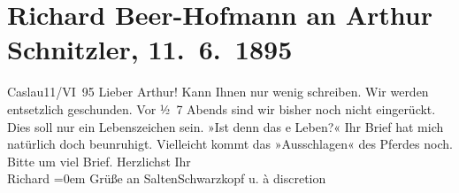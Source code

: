 

         
         \renewcommand{\erwaehntePersonen}{Personen: Felix Salten, Gustav Schwarzkopf}
         \renewcommand{\erwaehnteOrte}{Orte: Caslau, Wien}
         \renewcommand{\erwaehnteWerke}{}
               \section[Richard Beer-Hofmann an Arthur Schnitzler, 11. 6. 1895]{ Richard Beer-Hofmann an Arthur Schnitzler,
               11. 6. 1895}\nopagebreak{}\rehead{ }\begin{ledgroupsized}[t]{13cm}\normalsize\beginnumbering \toendnotes[C]{\smallbreak\pagebreak[2]} 
\pstart
           {\pb}Caslau11/VI 95\pend
           \pstart
           Lieber Arthur! Kann Ihnen nur wenig schreiben. Wir werden
               entsetzlich geschunden. Vor ½ 7 Abends
                sind wir bisher noch nicht
               eingerückt. Dies soll nur ein Lebenszeichen sein. »Ist denn {\pb}das e Leben?« Ihr Brief hat mich
               natürlich doch beunruhigt. Vielleicht kommt das »Ausschlagen« des Pferdes noch. Bitte
               um viel Brief. Herzlichst\pend
           \pstart
           Ihr{\\[\baselineskip]}\spacefill\mbox{Richard}\pend
           \leftskip=0em{}\pstart
           Grüße an SaltenSchwarzkopf u. à discretion\pend
           
         
         \endnumbering{}\end{ledgroupsized}  \newcommand{\dateiname}{L00451}\newcommand{\titel}{Richard Beer-Hofmann an Arthur Schnitzler, 11. 6. 1895}\newcommand{\editorInnen}{Martin Anton Müller und Gerd-Hermann Susen}
      